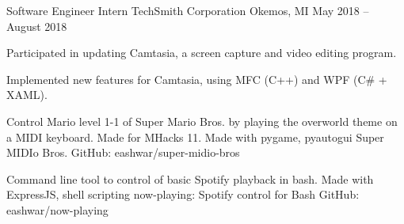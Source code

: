 \documentclass[]{awesome-cv}
\begin{document}
	\vspace{-4mm}
	\cventry
	{Software Engineer Intern}
	{TechSmith Corporation}
	{Okemos, MI}
	{May 2018 – August 2018}
	{\begin{cvitems}
		\item {Participated in updating Camtasia, a screen capture and video editing program.}
		\item {Implemented new features for Camtasia, using MFC (C++) and WPF (C\# + XAML).}
	\end{cvitems}}



\vspace{-5mm}
\vspace{-2mm}

	\cventry
	{Control Mario level 1-1 of Super Mario Bros. by playing the overworld theme on a MIDI keyboard. Made for MHacks 11.
	 Made with pygame, pyautogui}
	{Super MIDIo Bros.}
	{GitHub: eashwar/super-midio-bros}
	{}
	{}

	\vspace{-6mm}
	\cventry
	{Command line tool to control of basic Spotify playback in bash. Made with ExpressJS, shell scripting}
	{now-playing: Spotify control for Bash}
	{GitHub: eashwar/now-playing}
	{}
	{}
	
\end{document}
